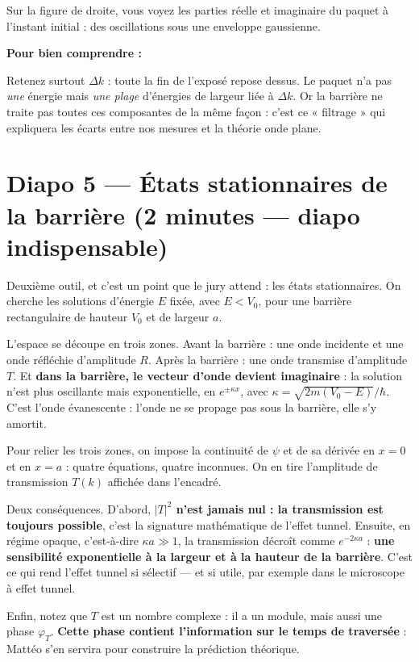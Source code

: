 \documentclass[11pt,a4paper]{article}
\newcommand{\diapo}[2]{\section*{Diapo #1 --- #2}}
\newenvironment{comprendre}%
{\par\medskip\noindent\hrulefill\par\nopagebreak\textbf{Pour bien comprendre :}\itshape\par}%
{\par\nopagebreak\noindent\hrulefill\par\medskip}
\begin{document}
	Sur la figure de droite, vous voyez les parties réelle et imaginaire du paquet à
	l'instant initial : des oscillations sous une enveloppe gaussienne.
	
	\begin{comprendre}
		Retenez surtout $\Delta k$ : toute la fin de l'exposé repose dessus. Le paquet
		n'a pas \emph{une} énergie mais \emph{une plage} d'énergies de largeur liée à
		$\Delta k$. Or la barrière ne traite pas toutes ces composantes de la même
		façon : c'est ce « filtrage » qui expliquera les écarts entre nos mesures et la
		théorie onde plane.
	\end{comprendre}
	
	\diapo{5}{États stationnaires de la barrière (2 minutes --- diapo indispensable)}
	
	Deuxième outil, et c'est un point que le jury attend : les états stationnaires.
	On cherche les solutions d'énergie $E$ fixée, avec $E < V_0$, pour une barrière
	rectangulaire de hauteur $V_0$ et de largeur $a$.
	
	L'espace se découpe en trois zones. Avant la barrière : une onde incidente et une
	onde réfléchie d'amplitude $R$. Après la barrière : une onde transmise
	d'amplitude $T$. Et \textbf{dans la barrière, le vecteur d'onde devient
		imaginaire} : la solution n'est plus oscillante mais exponentielle, en
	$e^{\pm\kappa x}$, avec $\kappa = \sqrt{2m(V_0 - E)}/\hbar$. C'est l'onde
	évanescente : l'onde ne se propage pas sous la barrière, elle s'y amortit.
	
	Pour relier les trois zones, on impose la continuité de $\psi$ et de sa dérivée
	en $x = 0$ et en $x = a$ : quatre équations, quatre inconnues. On en tire
	l'amplitude de transmission $T(k)$ affichée dans l'encadré.
	
	Deux conséquences. D'abord, \textbf{$|T|^2$ n'est jamais nul : la transmission
		est toujours possible}, c'est la signature mathématique de l'effet tunnel.
	Ensuite, en régime opaque, c'est-à-dire $\kappa a \gg 1$, la transmission décroît
	comme $e^{-2\kappa a}$ : \textbf{une sensibilité exponentielle à la largeur et à
		la hauteur de la barrière}. C'est ce qui rend l'effet tunnel si sélectif --- et
	si utile, par exemple dans le microscope à effet tunnel.
	
	Enfin, notez que $T$ est un nombre complexe : il a un module, mais aussi une
	phase $\varphi_T$. \textbf{Cette phase contient l'information sur le temps de
		traversée} : Mattéo s'en servira pour construire la prédiction théorique.
	
\end{document}
